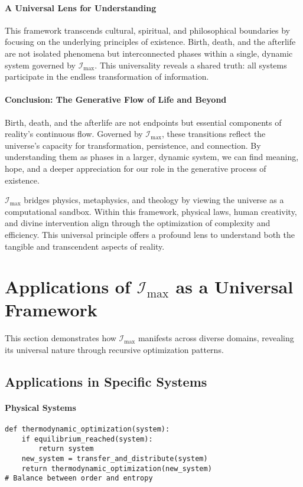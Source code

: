 \documentclass[12pt]{article}
\begin{document}
\paragraph{A Universal Lens for Understanding}
This framework transcends cultural, spiritual, and philosophical boundaries by focusing on the underlying principles of existence. Birth, death, and the afterlife are not isolated phenomena but interconnected phases within a single, dynamic system governed by \(\mathcal{I}_{\text{max}}\). This universality reveals a shared truth: all systems participate in the endless transformation of information.

\paragraph{Conclusion: The Generative Flow of Life and Beyond}
Birth, death, and the afterlife are not endpoints but essential components of reality’s continuous flow. Governed by \(\mathcal{I}_{\text{max}}\), these transitions reflect the universe’s capacity for transformation, persistence, and connection. By understanding them as phases in a larger, dynamic system, we can find meaning, hope, and a deeper appreciation for our role in the generative process of existence.

\(\mathcal{I}_{\text{max}}\) bridges physics, metaphysics, and theology by viewing the universe as a computational sandbox. Within this framework, physical laws, human creativity, and divine intervention align through the optimization of complexity and efficiency. This universal principle offers a profound lens to understand both the tangible and transcendent aspects of reality.


\section{Applications of $\mathcal{I}_{\text{max}}$ as a Universal Framework}

This section demonstrates how $\mathcal{I}_{\text{max}}$ manifests across diverse domains, revealing its universal nature through recursive optimization patterns.

\subsection{Applications in Specific Systems}

\paragraph{Physical Systems}
\begin{verbatim}
def thermodynamic_optimization(system):
    if equilibrium_reached(system):
        return system
    new_system = transfer_and_distribute(system)
    return thermodynamic_optimization(new_system)
# Balance between order and entropy
\end{verbatim}
\end{document}

